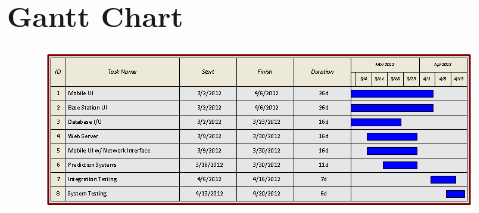 \documentclass[11pt,letterpaper]{article}
\begin{document}
\section{Gantt Chart}
\begin{figure}[h!]
\begin{center}
\includegraphics[scale=.6]{GanttChartI}
\end{center}
\end{figure}
\end{document}

